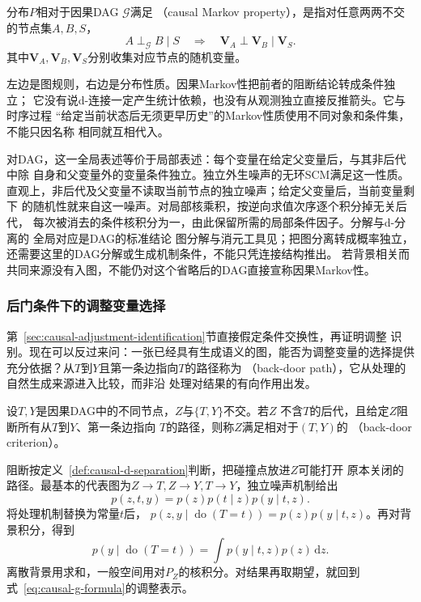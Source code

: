 \begin{definition}[因果Markov性]
  \label{def:causal-markov-property}
  分布\(P\)相对于因果DAG \(\mathcal G\)满足
  （causal Markov property），是指对任意两两不交的节点集\(A,B,S\)，
  \[
    A\perp_{\mathcal G}B\mid S
    \quad\Longrightarrow\quad
    \bm V_A\perp\bm V_B\mid\bm V_S.
  \]
  其中\(\bm V_A,\bm V_B,\bm V_S\)分别收集对应节点的随机变量。
\end{definition}

左边是图规则，右边是分布性质。因果Markov性把前者的阻断结论转成条件独立；
它没有说d-连接一定产生统计依赖，也没有从观测独立直接反推箭头。它与时序过程
“给定当前状态后无须更早历史”的Markov性质使用不同对象和条件集，不能只因名称
相同就互相代入。

对DAG，这一全局表述等价于局部表述：每个变量在给定父变量后，与其非后代中除
自身和父变量外的变量条件独立。独立外生噪声的无环SCM满足这一性质。
直观上，非后代及父变量不读取当前节点的独立噪声；给定父变量后，当前变量剩下
的随机性就来自这一噪声。对局部核乘积，按逆向求值次序逐个积分掉无关后代，
每次被消去的条件核积分为一，由此保留所需的局部条件因子。分解与d-分离的
全局对应是DAG的标准结论
图分解与消元工具见；把图分离转成概率独立，
还需要这里的DAG分解或生成机制条件，不能只凭连接结构推出。
若背景相关而共同来源没有入图，不能仍对这个省略后的DAG直接宣称因果Markov性。

\subsubsection{后门条件下的调整变量选择}
\label{sec:causal-backdoor-selection}

第~\ref{sec:causal-adjustment-identification}节直接假定条件交换性，再证明调整
识别。现在可以反过来问：一张已经具有生成语义的图，能否为调整变量的选择提供
充分依据？从\(T\)到\(Y\)且第一条边指向\(T\)的路径称为
（back-door path），它从处理的自然生成来源进入比较，而非沿
处理对结果的有向作用出发。

\begin{definition}
  \label{def:causal-backdoor-criterion}
  设\(T,Y\)是因果DAG中的不同节点，\(Z\)与\(\{T,Y\}\)不交。若\(Z\)
  不含\(T\)的后代，且给定\(Z\)阻断所有从\(T\)到\(Y\)、第一条边指向
  \(T\)的路径，则称\(Z\)满足相对于\((T,Y)\)的
  （back-door criterion）。
\end{definition}

阻断按定义~\ref{def:causal-d-separation}判断，把碰撞点放进\(Z\)可能打开
原本关闭的路径。最基本的代表图为\(Z\to T,Z\to Y,T\to Y\)，独立噪声机制给出
\[
  p(z,t,y)=p(z)p(t\mid z)p(y\mid t,z).
\]
将处理机制替换为常量\(t\)后，
\(p(z,y\mid\operatorname{do}(T=t))=p(z)p(y\mid t,z)\)。再对背景积分，得到
\begin{equation}
  p(y\mid\operatorname{do}(T=t))
  =
  \int p(y\mid t,z)p(z)\,\mathrm dz.
  \label{eq:causal-backdoor-adjustment}
\end{equation}
离散背景用求和，一般空间用对\(P_Z\)的核积分。对结果再取期望，就回到
式~\eqref{eq:causal-g-formula}的调整表示。

